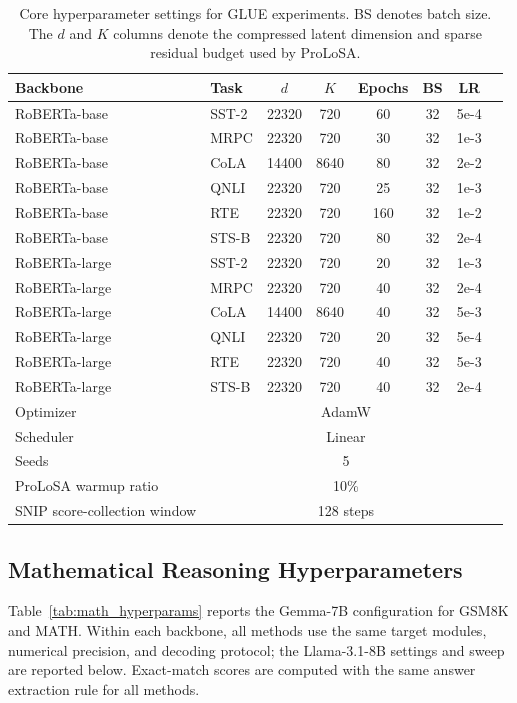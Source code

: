 \begin{table}[htbp]
\centering
\footnotesize
\setlength{\tabcolsep}{2pt}
\begin{tabular}{llcccccc}
\toprule
Backbone & Task & $d$ & $K$ & Epochs & BS & LR \\
\midrule
RoBERTa-base  & SST-2 & 22320 & 720 & 60  & 32 & 5e-4 \\
RoBERTa-base  & MRPC  & 22320 & 720 & 30  & 32 & 1e-3 \\
RoBERTa-base  & CoLA  & 14400 & 8640 & 80  & 32 & 2e-2 \\
RoBERTa-base  & QNLI  & 22320 & 720 & 25  & 32 & 1e-3 \\
RoBERTa-base  & RTE   & 22320 & 720 & 160 & 32 & 1e-2 \\
RoBERTa-base  & STS-B & 22320 & 720 & 80  & 32 & 2e-4 \\
RoBERTa-large & SST-2 & 22320 & 720 & 20  & 32 & 1e-3 \\
RoBERTa-large & MRPC  & 22320 & 720 & 40  & 32 & 2e-4 \\
RoBERTa-large & CoLA  & 14400 & 8640 & 40  & 32 & 5e-3 \\
RoBERTa-large & QNLI  & 22320 & 720 & 20  & 32 & 5e-4 \\
RoBERTa-large & RTE   & 22320 & 720 & 40  & 32 & 5e-3 \\
RoBERTa-large & STS-B & 22320 & 720 & 40  & 32 & 2e-4 \\
\midrule
Optimizer & \multicolumn{6}{c}{AdamW} \\
Scheduler & \multicolumn{6}{c}{Linear} \\
Seeds & \multicolumn{6}{c}{5} \\
ProLoSA warmup ratio & \multicolumn{6}{c}{10\%} \\
SNIP score-collection window & \multicolumn{6}{c}{128 steps}\\
\bottomrule
\end{tabular}
\caption{Core hyperparameter settings for GLUE experiments. BS denotes batch size. The $d$ and $K$ columns denote the compressed latent dimension and sparse residual budget used by ProLoSA.}
\label{tab:glue_hyperparams}
\end{table}

\subsection{Mathematical Reasoning Hyperparameters}

Table~\ref{tab:math_hyperparams} reports the Gemma-7B configuration for GSM8K and MATH.
Within each backbone, all methods use the same target modules, numerical precision, and decoding protocol; the Llama-3.1-8B settings and sweep are reported below.
Exact-match scores are computed with the same answer extraction rule for all methods.

